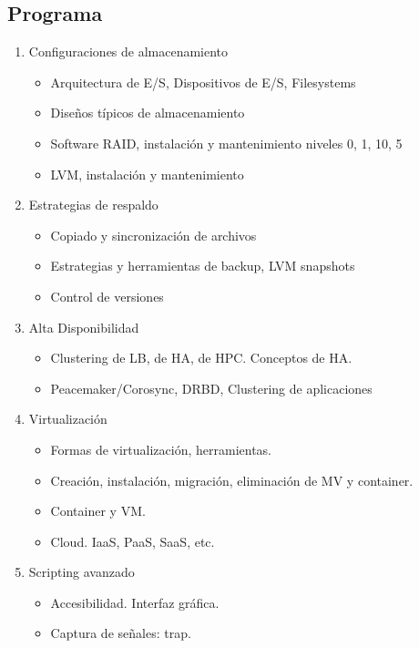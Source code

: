 \subsection {Programa}
\begin{enumerate}
\item Configuraciones de almacenamiento
\begin{itemize}
	\item   Arquitectura de E/S, Dispositivos de E/S, Filesystems
	\item	Diseños típicos de almacenamiento
	\item	Software RAID, instalación y mantenimiento niveles 0, 1, 10, 5 
	\item	LVM, instalación y mantenimiento	 
\end{itemize}
	
\item Estrategias de respaldo
\begin{itemize}
	\item Copiado y sincronización de archivos
	\item Estrategias y herramientas de backup, LVM snapshots
	\item Control de versiones
\end{itemize}

\item Alta Disponibilidad
\begin{itemize}
	\item Clustering de LB, de HA, de HPC. Conceptos de HA.
	\item Peacemaker/Corosync, DRBD, Clustering de aplicaciones
\end{itemize}

\item Virtualización
\begin{itemize}
	\item Formas de virtualización, herramientas. 
	\item Creación, instalación, migración, eliminación de MV y container.
        \item Container y VM.  
	\item Cloud. IaaS, PaaS, SaaS, etc.
\end{itemize}
\item Scripting avanzado
\begin{itemize}
	\item Accesibilidad. Interfaz gráfica. 
	\item Captura de señales: trap. 
\end{itemize}
\end{enumerate}

